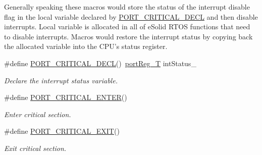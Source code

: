 Generally speaking these macros would store the status of the interrupt disable flag in the local variable declared by \hyperlink{group__template__cpu__intf_gaecf0dc273d0d77b45baa682e0f2932ab}{P\-O\-R\-T\-\_\-\-C\-R\-I\-T\-I\-C\-A\-L\-\_\-\-D\-E\-C\-L} and then disable interrupts. Local variable is allocated in all of e\-Solid R\-T\-O\-S functions that need to disable interrupts. Macros would restore the interrupt status by copying back the allocated variable into the C\-P\-U's status register. \begin{DoxyCompactItemize}
\item 
\#define \hyperlink{group__template__cpu__intf_gaecf0dc273d0d77b45baa682e0f2932ab}{P\-O\-R\-T\-\_\-\-C\-R\-I\-T\-I\-C\-A\-L\-\_\-\-D\-E\-C\-L}()~\hyperlink{group__template__cpu__intf_ga99980ab56ce9857e7380210d12e3d41f}{port\-Reg\-\_\-\-T} int\-Status\-\_\-
\begin{DoxyCompactList}\small\item\em Declare the interrupt status variable. \end{DoxyCompactList}\item 
\#define \hyperlink{group__template__cpu__intf_gad230b116bf8bc513e64c533d4e946054}{P\-O\-R\-T\-\_\-\-C\-R\-I\-T\-I\-C\-A\-L\-\_\-\-E\-N\-T\-E\-R}()
\begin{DoxyCompactList}\small\item\em Enter critical section. \end{DoxyCompactList}\item 
\#define \hyperlink{group__template__cpu__intf_ga95082ec189f12ed8e39efbda811dea77}{P\-O\-R\-T\-\_\-\-C\-R\-I\-T\-I\-C\-A\-L\-\_\-\-E\-X\-I\-T}()
\begin{DoxyCompactList}\small\item\em Exit critical section. \end{DoxyCompactList}\end{DoxyCompactItemize}
